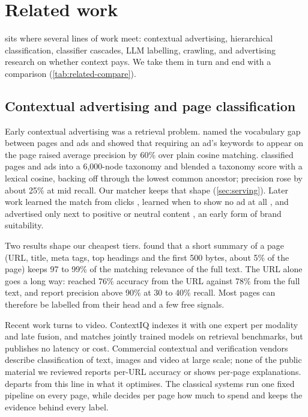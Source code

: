 \section{Related work}\label{sec:related}

\sys{} sits where several lines of work meet: contextual advertising, hierarchical classification, classifier cascades, LLM labelling, crawling, and advertising research on whether context pays. We take them in turn and end with a comparison (\cref{tab:related-compare}).

\subsection{Contextual advertising and page classification}\label{sec:related-ctx}

Early contextual advertising was a retrieval problem. \citet{ribeironeto2005impedance} named the vocabulary gap between pages and ads and showed that requiring an ad's keywords to appear on the page raised average precision by 60\% over plain cosine matching. \citet{broder2007semantic} classified pages and ads into a 6,000-node taxonomy and blended a taxonomy score with a lexical cosine, backing off through the lowest common ancestor; precision rose by about 25\% at mid recall. Our matcher keeps that shape (\cref{sec:serving}). Later work learned the match from clicks \citep{chakrabarti2008contextual}, learned when to show no ad at all \citep{broder2008swing}, and advertised only next to positive or neutral content \citep{fan2010sentiment}, an early form of brand suitability.

Two results shape our cheapest tiers. \citet{anagnostopoulos2007just} found that a short summary of a page (URL, title, meta tags, top headings and the first 500 bytes, about 5\% of the page) keeps 97 to 99\% of the matching relevance of the full text. The URL alone goes a long way: \citet{kan2005fast} reached 76\% accuracy from the URL against 78\% from the full text, and \citet{baykan2011comprehensive} report precision above 90\% at 30 to 40\% recall. Most pages can therefore be labelled from their head and a few free signals.

Recent work turns to video. ContextIQ \citep{chaubey2025contextiq} indexes it with one expert per modality and late fusion, and matches jointly trained models on retrieval benchmarks, but publishes no latency or cost. Commercial contextual and verification vendors describe classification of text, images and video at large scale; none of the public material we reviewed reports per-URL accuracy or shows per-page explanations. \sys{} departs from this line in what it optimises. The classical systems run one fixed pipeline on every page, while \sys{} decides per page how much to spend and keeps the evidence behind every label.


